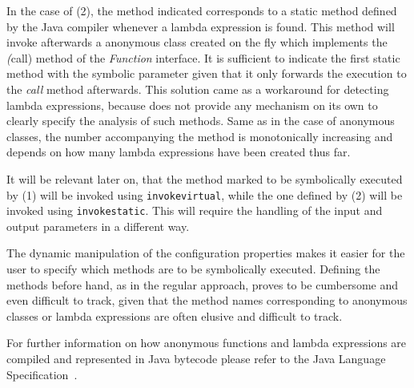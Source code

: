 In the case of (2), the method indicated corresponds to a static method defined by the Java compiler whenever a lambda expression is found. This method will invoke afterwards a anonymous class created on the fly which implements the \textit(call) method of the \textit{Function} interface. It is sufficient to indicate the first static method with the symbolic parameter given that it only forwards the execution to the \textit{call} method afterwards. This solution came as a workaround for detecting lambda expressions, because \spf does not provide any mechanism on its own to clearly specify the analysis of such methods. Same as in the case of anonymous classes, the number accompanying the method is monotonically increasing and depends on how many lambda expressions have been created thus far.

It will be relevant later on, that the method marked to be symbolically executed by (1) will be invoked using \texttt{invokevirtual}, while the one defined by (2) will be invoked using \texttt{invokestatic}. This will require the handling of the input and output parameters in a different way.

The dynamic manipulation of the configuration properties makes it easier for the user to specify which methods are to be symbolically executed. Defining the methods before hand, as in the regular \spf approach, proves to be cumbersome and even difficult to track, given that the method names corresponding to anonymous classes or lambda expressions are often elusive and difficult to track.

For further information on how anonymous functions and lambda expressions are compiled and represented in Java bytecode please refer to the Java Language Specification~\cite{Gosling2014}.


